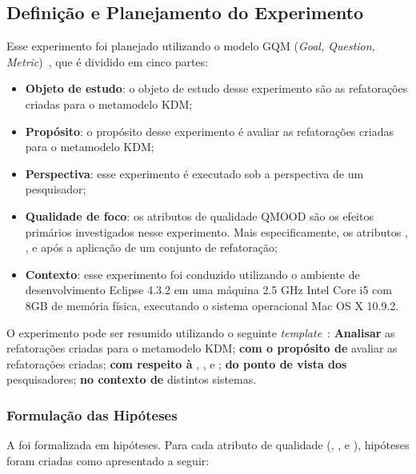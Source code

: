 \subsection{Definição e Planejamento do Experimento}

Esse experimento foi planejado utilizando o modelo GQM (\textit{Goal, Question, Metric})~\cite{Wohlin}, que é dividido em cinco partes: 

\begin{itemize}
\item \textbf{Objeto de estudo}: o objeto de estudo desse experimento são as refatorações criadas para o metamodelo KDM;
\item \textbf{Propósito}: o propósito desse experimento é avaliar as refatorações criadas para o metamodelo KDM;
\item \textbf{Perspectiva}: esse experimento é executado sob a perspectiva de um pesquisador;
\item \textbf{Qualidade de foco}: os atributos de qualidade QMOOD são os efeitos primários investigados nesse experimento. Mais especificamente, os atributos , ,  e  após a aplicação de um conjunto de refatoração;
\item \textbf{Contexto}: esse experimento foi conduzido utilizando o ambiente de desenvolvimento Eclipse 4.3.2 em uma máquina 2.5 GHz Intel Core i5 com 8GB de memória física, executando o sistema operacional Mac OS X 10.9.2.
\end{itemize}


O experimento pode ser resumido utilizando o seguinte \textit{template}~\cite{Wohlin}: \textbf{Analisar} as refatorações criadas para o metamodelo KDM; \textbf{com o propósito de} avaliar as refatorações criadas; \textbf{com respeito à} , ,  e ; \textbf{do ponto de vista dos} pesquisadores; \textbf{no contexto de} distintos sistemas.

\subsubsection{Formulação das Hipóteses}

A  foi formalizada em hipóteses. Para cada atributo de qualidade (, ,  e ), hipóteses foram criadas como apresentado a seguir:

